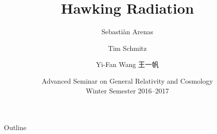 \documentclass{beamer}
\title%
{Hawking Radiation}
\author[Wang, Arenas, Schmitz] %
{Sebastiàn Arenas \and Tim Schmitz \and Yi-Fan Wang 王一帆}
\institute[Uni Köln] %
{
  Universität zu Köln}
\date[ASGRC WS1617] %
{Advanced Seminar on General Relativity and Cosmology \\
Winter Semester 2016--2017}
\begin{document}
\begin{frame}
  \titlepage
\end{frame}

\begin{frame}{Outline}
  \tableofcontents
\end{frame}









\end{document}
